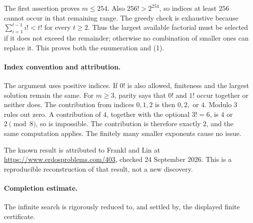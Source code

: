 The first assertion proves \(m\leq254\). Also \(256!>2^{254}\),
so indices at least \(256\) cannot occur in that remaining range.
The greedy check is exhaustive because
\(\sum_{i=1}^{t-1}i!<t!\) for every \(t\geq2\).
Thus the largest available factorial must be selected if it does not
exceed the remainder; otherwise no combination of smaller ones can
replace it. This proves both the enumeration and (1).

\paragraph{Index convention and attribution.}
The argument uses positive indices. If \(0!\) is also allowed, finiteness
and the largest solution remain the same. For \(m\geq3\), parity says
that \(0!\) and \(1!\) occur together or neither does. The contribution
from indices \(0,1,2\) is then \(0,2,\) or \(4\). Modulo \(3\) rules out
zero. A contribution of \(4\), together with the optional \(3!=6\),
is \(4\) or \(2\pmod8\), so is impossible. The contribution is therefore
exactly \(2\), and the same computation applies. The finitely many
smaller exponents cause no issue.

The known result is attributed to Frankl and Lin at
\url{https://www.erdosproblems.com/403}, checked 24 September 2026.
This is a reproducible reconstruction of that result, not a new discovery.

\paragraph{Completion estimate.}
The infinite search is rigorously reduced to, and settled by, the displayed finite certificate.
